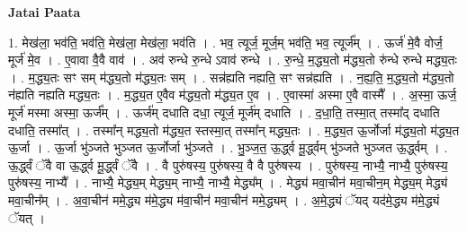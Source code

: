 \documentclass[17pt]{extarticle}
\begin{document}
\textbf{Jatai Paata} \newline

1. मेख॑ला॒ भव॑ति॒ भव॑ति॒ मेख॑ला॒ मेख॑ला॒ भव॑ति । . भव॒ त्यूर्ज॒ मूर्ज॒म् भव॑ति॒ भव॒ त्यूर्ज᳚म् । . ऊर्ज॑ मे॒वै वोर्ज॒ मूर्ज॑ मे॒व । . ए॒वावा वै॒वै वाव॑ । . अव॑ रुन्धे रु॒न्धे ऽवाव॑ रुन्धे । . रु॒न्धे॒ म॒द्ध्य॒तो म॑द्ध्य॒तो रु॑न्धे रुन्धे मद्ध्य॒तः । . म॒द्ध्य॒तः सꣳ सम् म॑द्ध्य॒तो म॑द्ध्य॒तः सम् । . सन्न॑ह्यति नह्यति॒ सꣳ सन्न॑ह्यति । . न॒ह्य॒ति॒ म॒द्ध्य॒तो म॑द्ध्य॒तो न॑ह्यति नह्यति मद्ध्य॒तः । . म॒द्ध्य॒त ए॒वैव म॑द्ध्य॒तो म॑द्ध्य॒त ए॒व । . ए॒वास्मा॑ अस्मा ए॒वै वास्मै᳚ । . अ॒स्मा॒ ऊर्ज॒ मूर्ज॑ मस्मा अस्मा॒ ऊर्ज᳚म् । . ऊर्ज॑म् दधाति दधा॒ त्यूर्ज॒ मूर्ज॑म् दधाति । . द॒धा॒ति॒ तस्मा॒त् तस्मा᳚द् दधाति दधाति॒ तस्मा᳚त् । . तस्मा᳚न् मद्ध्य॒तो म॑द्ध्य॒त स्तस्मा॒त् तस्मा᳚न् मद्ध्य॒तः । . म॒द्ध्य॒त ऊ॒र्जोर्जा म॑द्ध्य॒तो म॑द्ध्य॒त ऊ॒र्जा । . ऊ॒र्जा भु॑ञ्जते भुञ्जत ऊ॒र्जोर्जा भु॑ञ्जते । . भु॒ञ्ज॒त॒ ऊ॒र्द्ध्व मू॒र्द्ध्वम् भु॑ञ्जते भुञ्जत ऊ॒र्द्ध्वम् । . ऊ॒र्द्ध्वं ॅवै वा ऊ॒र्द्ध्व मू॒र्द्ध्वं ॅवै । . वै पुरु॑षस्य॒ पुरु॑षस्य॒ वै वै पुरु॑षस्य । . पुरु॑षस्य॒ नाभ्यै॒ नाभ्यै॒ पुरु॑षस्य॒ पुरु॑षस्य॒ नाभ्यै᳚ । . नाभ्यै॒ मेद्ध्य॒म् मेद्ध्य॒म् नाभ्यै॒ नाभ्यै॒ मेद्ध्य᳚म् । . मेद्ध्य॑ मवा॒चीन॑ मवा॒चीन॒म् मेद्ध्य॒म् मेद्ध्य॑ मवा॒चीन᳚म् । . अ॒वा॒चीन॑ ममे॒द्ध्य म॑मे॒द्ध्य म॑वा॒चीन॑ मवा॒चीन॑ ममे॒द्ध्यम् । . अ॒मे॒द्ध्यं ॅयद् यद॑मे॒द्ध्य म॑मे॒द्ध्यं ॅयत् । \newline
\end{document}
